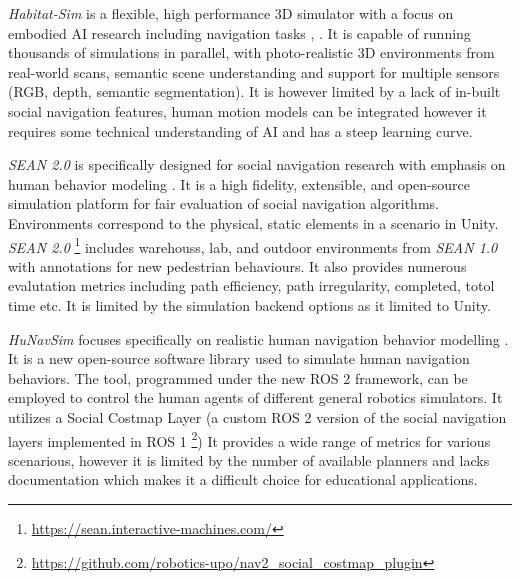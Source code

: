 \textit{Habitat-Sim} is a flexible, high performance 3D simulator with a focus on embodied AI 
research including navigation tasks \cite{habitat}, \cite{szot2022habitat20traininghome}. 
It is capable of running thousands of simulations in parallel, with photo-realistic 3D 
environments from real-world scans, semantic scene understanding and support for multiple 
sensors (RGB, depth, semantic segmentation). It is however limited by a lack of in-built 
social navigation features, human motion models can be integrated however it requires some
technical understanding of AI and has a steep learning curve. 

\textit{SEAN 2.0} is specifically designed for social navigation research with emphasis on 
human behavior modeling \cite{tsoi2022sean2}. It is a high fidelity, extensible, and open-source simulation platform for fair evaluation of social navigation algorithms. 
Environments correspond to the physical, static elements in a scenario in Unity. \textit{SEAN 2.0}
\footnote{\href{https://sean.interactive-machines.com/}{https://sean.interactive-machines.com/}}
includes warehouss, lab, and outdoor environments from \textit{SEAN 1.0} with annotations 
for new pedestrian behaviours. It also provides numerous evalutation metrics including path 
efficiency, path irregularity, completed, totol time etc. It is limited by the simulation 
backend options as it limited to Unity.  

\textit{HuNavSim} focuses specifically on realistic human navigation behavior modelling \cite{hunavsimros2human}.
It is a new open-source software library used to simulate human navigation behaviors. The tool,
programmed under the new ROS 2 framework, can be employed to control the human agents of 
different general robotics simulators. It utilizes a Social Costmap Layer (a custom ROS 2 version 
of the social navigation layers implemented in ROS 1
\footnote{\href{https://github.com/robotics-upo/nav2_social_costmap_plugin}
{https://github.com/robotics-upo/nav2\_social\_costmap\_plugin}})
It provides a wide range of metrics for various scenarious, however it is limited by the number of 
available planners and lacks documentation which makes it a difficult choice for educational 
applications.

